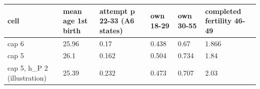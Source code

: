 \begingroup\small
\setlength{\tabcolsep}{3pt}
\renewcommand{\arraystretch}{1.04}
\begin{tabularx}{\linewidth}{XXXXXX}
\toprule
cell & mean age 1st birth & attempt p 22-33 (A6 states) & own 18-29 & own 30-55 & completed fertility 46-49 \\
\midrule
cap 6 & 25.96 & 0.17 & 0.438 & 0.67 & 1.866 \\
cap 5 & 26.1 & 0.162 & 0.504 & 0.734 & 1.84 \\
cap 5, h\_P 2 (illustration) & 25.39 & 0.232 & 0.473 & 0.707 & 2.03 \\
\bottomrule
\end{tabularx}
\endgroup
